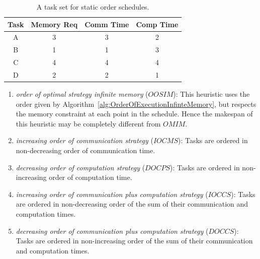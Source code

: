 \documentclass[sigconf]{acmart}
\begin{document}
	\begin{table}[!tb]
	\begin{center}
		\begin{tabular}{|c|c|c|c|}
			\hline
	    	Task & Memory Req & Comm Time & Comp Time\\ \hline 
			A & 3 & 3 &  2\\ \hline
			B & 1 & 1 & 3\\ \hline
			C & 4 & 4 & 4\\ \hline
			D & 2 & 2 & 1\\ \hline
		\end{tabular}
		\caption{\label{tab:staticOrderExample} A task set for static order schedules.\vspace*{-0.75cm}}
	\end{center}
\end{table}
	
	\begin{enumerate}[label=\roman*)]
		\item \textit{order of optimal strategy infinite memory} ($OOSIM$): This heuristic uses the order given by Algorithm~\ref{alg:OrderOfExecutionInfinteMemory}, but respects the memory constraint at each point in the schedule. Hence the makespan of this heuristic may be completely different from $OMIM$.
		
		\item \textit{increasing order of communication strategy} ($IOCMS$): Tasks are ordered  in non-decreasing order of communication time. 
		
		\item \textit{decreasing order of computation strategy} ($DOCPS$): Tasks are ordered in non-increasing order of computation time. 
		\item \textit{increasing order of communication plus computation strategy} ($IOCCS$): Tasks are ordered in non-decreasing order of the sum of their communication and computation times.
		\item \textit{decreasing order of communication plus computation strategy} ($DOCCS$): Tasks are ordered in non-increasing order of the sum of their communication and computation times.
		
	\end{enumerate}
\end{document}
